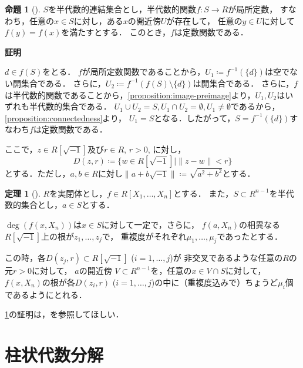 \documentclass[uplatex, dvipdfmx]{jsarticle}
\makeatletter
\numberwithin{equation}{section}
\renewenvironment{proof}[1][\proofname]{\par
  \pushQED{\qed}%
  \normalfont \topsep6\p@\@plus6\p@\relax
  \trivlist
  \item\relax
  {\bfseries
  #1\@addpunct{.}}\hspace\labelsep\ignorespaces
}{
  \popQED\endtrivlist\@endpefalse
}
\newcommand{\map}[3]{{#1}\colon{#2}\rightarrow{#3}}
\newcommand{\norm}[1]{\| {#1} \|}
\theoremstyle{definition}
\newtheorem{proposition}[definition]{命題}
\newtheorem{theorem}[definition]{定理}
\renewcommand{\proofname}{\textbf{証明}}
\makeatother
\begin{document}
\begin{proposition}[{\cite[Proposition 3.9]{MR2248869}}]\label{proposition:locally-constant}
     $S$を半代数的連結集合とし，半代数的関数$\map{f}{S}{R}$が局所定数，
     すなわち，任意の$x \in S$に対し，ある$x$の開近傍$U$が存在して，
     任意の$y \in U$に対して$f(y)=f(x)$を満たすとする．
     このとき，$f$は定数関数である．
\end{proposition}
\begin{proof}
     $d \in f(S)$をとる．
     $f$が局所定数関数であることから，$U_1\coloneqq f^{-1}(\{d\})$は空でない開集合である．
     さらに，$U_2\coloneqq f^{-1}(f(S) \setminus \{d\})$は開集合である．
     さらに，$f$は半代数的関数であることから，\cref{proposition:image-preimage}より，$U_1, U_2$はいずれも半代数的集合である．
     $U_1 \cup U_2 = S, U_1 \cap U_2 = \emptyset, U_1 \neq \emptyset$であるから，\cref{proposition:connectedness}より，
     $U_1 = S$となる．したがって，$S = f^{-1}(\{d\})$すなわち$f$は定数関数である．
\end{proof}

ここで，$z \in R\left[ \sqrt{-1} \right]$及び$r \in R$, $r>0$, に対し，
\begin{equation}
     D(z, r)\coloneqq \{w \in R\left[\sqrt{-1}\right] \mid \norm{z - w} < r\}
\end{equation}
とする．ただし，$a,b \in R$に対し$\norm{a + b\sqrt{-1}} \coloneqq \sqrt{a^2 + b^2}$とする．

\begin{theorem}[{\cite[Theorem 5.12]{MR2248869}}] \label{theorem:continuity-of-roots}
     $R$を実閉体とし，$f \in R[X_1, \dots, X_n]$とする．
     また，$S \subset R^{n-1}$を半代数的集合とし，$a \in S$とする．

     $\deg (f(x,X_n))$は$x \in S$に対して一定で，さらに，
     $f(a,X_n)$の相異なる$R\left[\sqrt{-1} \right]$上の根が$z_1, \dots, z_j$で，
     重複度がそれぞれ$\mu_1, \dots, \mu_j$であったとする．

     この時，各$D(z_j, r) \subset R\left[ \sqrt{-1} \right]$ ($i=1, \dots, j$)が
     非交叉であるような任意の$R$の元$r > 0$に対して，
     $a$の開近傍 $V \subset R^{n-1}$を，任意の$x \in V \cap S$に対して，
     $f(x, X_n)$の根が各$D(z_i, r)$ ($i=1, \dots, j$)の中に（重複度込みで）ちょうど$\mu_i$個であるようにとれる．
\end{theorem}

\cref{theorem:continuity-of-roots}の証明は，\cite[Theorem 5.12]{MR2248869}を参照してほしい．


\section{柱状代数分解}\label{section:6}
\end{document}
